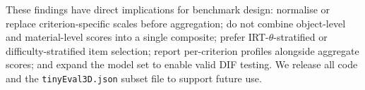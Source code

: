 \documentclass[10pt]{article}
\begin{document}
These findings have direct implications for benchmark design: normalise or
replace criterion-specific scales before aggregation; do not combine
object-level and material-level scores into a single composite; prefer
IRT-$\theta$-stratified or difficulty-stratified item selection; report
per-criterion profiles alongside aggregate scores; and expand the model set
to enable valid DIF testing.
We release all code and the \texttt{tinyEval3D.json} subset file to support
future use.




\end{document}
